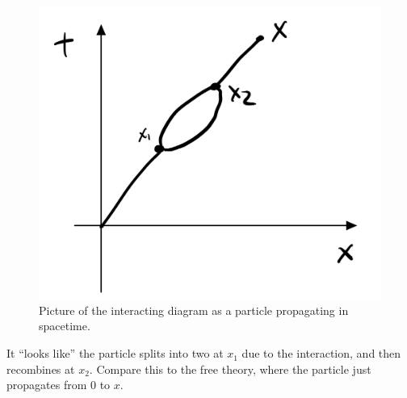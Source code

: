 \begin{figure}[htbp]
    \centering
    \includegraphics[scale=0.3]{Lectures/Figures/interactingprop-spacetime.png}
    \caption{Picture of the interacting diagram as a particle propagating in spacetime.}
    \label{fig:interactingprop-spacetime}
\end{figure}

It ``looks like'' the particle splits into two at $x_1$ due to the interaction, and then recombines at $x_2$. Compare this to the free theory, where the particle just propagates from $0$ to $x$.

